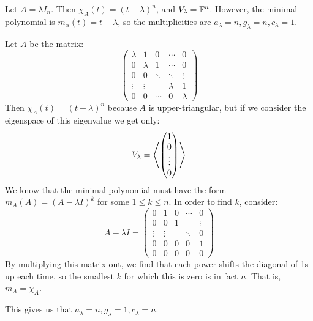 \documentclass[../Main.tex]{subfiles}
\begin{document}
\begin{examples}{
        
    }
    \item Let $A = \lambda I_n$. Then $\chi_A(t) = (t - \lambda)^n$, and $V_\lambda = \mathbb{F}^n$. However, the minimal polynomial is $m_\alpha(t) = t - \lambda$, so the multiplicities are $a_\lambda = n, g_\lambda = n, c_\lambda = 1$.
    \item Let $A$ be the matrix:
        \begin{equation*}
            \begin{pmatrix}
                \lambda & 1 & 0 & \cdots & 0 \\
                0 & \lambda & 1 & \cdots & 0 \\
                0 & 0 & \ddots & \ddots & \vdots \\
                \vdots & \vdots & & \lambda & 1 \\
                0 & 0 & \cdots & 0 & \lambda
            \end{pmatrix}
        \end{equation*}
        Then $\chi_A(t) = (t - \lambda)^n$ because $A$ is upper-triangular, but if we consider the eigenspace of this eigenvalue we get only:
        \begin{equation*}
            V_\lambda = \left\langle \begin{pmatrix} 1 \\ 0 \\ \vdots \\ 0\end{pmatrix} \right\rangle
        \end{equation*}
        We know that the minimal polynomial must have the form $m_A(A) = (A - \lambda I)^k$ for some $1 \leq k \leq n$. In order to find $k$, consider:
        \begin{equation*}
            A - \lambda I =
            \begin{pmatrix}
                0 & 1 & 0 & \cdots & 0 \\
                0 & 0 & 1 & & \vdots \\
                \vdots & \vdots & & \ddots & 0 \\
                0 & 0 & 0 & 0 & 1 \\
                0 & 0 & 0 & 0 & 0
            \end{pmatrix}
        \end{equation*}
        By multiplying this matrix out, we find that each power shifts the diagonal of 1s up each time, so the smallest $k$ for which this is zero is in fact $n$. That is, $m_A = \chi_A$.

        This gives us that $a_\lambda = n, g_\lambda = 1, c_\lambda = n$.
        \label{expJordanPolys}
\end{examples}
\end{document}
